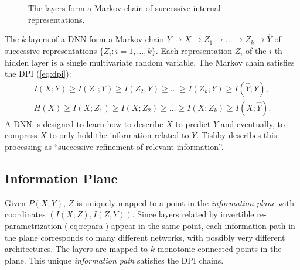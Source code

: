 \documentclass[11pt]{article}
\def\layersep{1.5cm}
\begin{document}
\begin{figure}[H]
{
}
\caption{The layers form a Markov chain of successive internal representations.}
\end{figure}

The $k$ layers of a DNN form a Markov chain ${Y \rightarrow X \rightarrow Z_1 \rightarrow \ldots \rightarrow Z_k \rightarrow \hat{Y}}$ of successive representations $\{Z_i:i=1,\ldots,k\}$. Each representation $Z_i$ of the $i$-th hidden layer is a single multivariate random variable. The Markov chain satisfies the DPI (\ref{eq:dpi}):
\begin{align}
I(X;Y) \geq I(Z_1;Y) \geq I(Z_2;Y) \geq \ldots \geq I(Z_k;Y) \geq I(\hat{Y};Y),\\
H(X) \geq I(X;Z_1) \geq I(X;Z_2) \geq \ldots \geq I(X;Z_k) \geq I(X;\hat{Y}).
\end{align}
A DNN is designed to learn how to describe $X$ to predict $Y$ and eventually, to compress $X$ to only hold the information related to $Y$. Tishby describes this processing as ``successive refinement of relevant information''.

\subsection*{Information Plane}

Given $P(X;Y)$, $Z$ is uniquely mapped to a point in the \emph{information plane} with coordinates $(I(X;Z),I(Z,Y))$. Since layers related by invertible re-parametrization (\ref{eq:repara}) appear in the same point, each information path in the plane corresponds to many different networks, with possibly very different architectures. The layers are mapped to $k$ monotonic connected points in the plane. This unique \emph{information path} satisfies the DPI chains.
\end{document}
